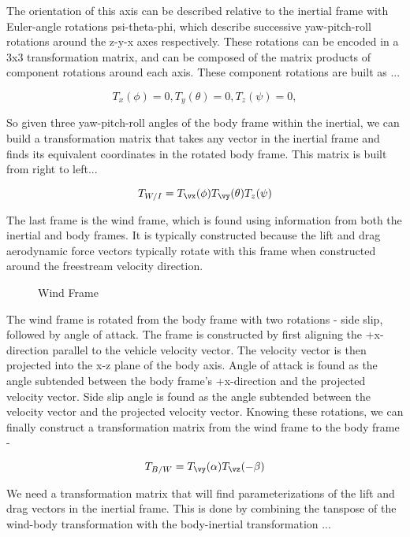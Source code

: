 \documentclass{article}
\begin{document}
The orientation of this axis can be described relative to the inertial frame with Euler-angle rotations psi-theta-phi, which describe successive yaw-pitch-roll rotations around the z-y-x axes respectively.  These rotations can be encoded in a 3x3 transformation matrix, and can be composed of the matrix products of component rotations around each axis.  These component rotations are built as ...

\begin{equation}
T_x(\phi) = 0, 
T_y(\theta) = 0, 
T_z(\psi) = 0, 
\end{equation}

So given three yaw-pitch-roll angles of the body frame within the inertial, we can build a transformation matrix that takes any vector in the inertial frame and finds its equivalent coordinates in the rotated body frame.  This matrix is built from right to left...

\begin{equation}
T_{W/I} = T_\vx(\phi) T_\vy(\theta) T_z(\psi)
\end{equation}


The last frame is the wind frame, which is found using information from both the inertial and body frames.  It is typically constructed because the lift and drag aerodynamic force vectors typically rotate with this frame when constructed around the freestream velocity direction.

\begin{figure}[htb] 
    \centering
    \def\svgwidth{150pt}
    
    \caption{Wind Frame}
\end{figure} 

The wind frame is rotated from the body frame with two rotations - side slip, followed by angle of attack.  The frame is constructed by first aligning the +x-direction parallel to the vehicle velocity vector.  The velocity vector is then projected into the x-z plane of the body axis.  Angle of attack is found as the angle subtended between the body frame's +x-direction and the projected velocity vector.  Side slip angle is found as the angle subtended between the velocity vector and the projected velocity vector.  Knowing these rotations, we can finally construct a transformation matrix from the wind frame to the body frame - 

\begin{equation}
T_{B/W} = T_\vy(\alpha) T_\vz(-\beta)
\end{equation}

We need a transformation matrix that will find parameterizations of the lift and drag vectors in the inertial frame.  This is done by combining the tanspose of the wind-body transformation with the body-inertial transformation ...
\end{document}
